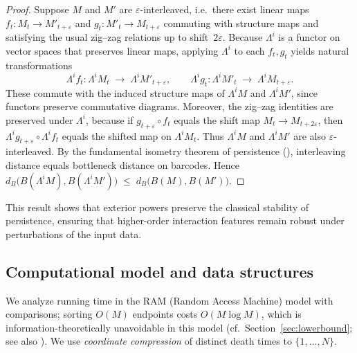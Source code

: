 \documentclass[runningheads]{llncs}
\newcommand{\B}{B}
\newcommand{\Lam}{\Lambda}
\begin{document}
\begin{proof}
Suppose $M$ and $M'$ are $\varepsilon$-interleaved, i.e.\ there exist
linear maps $f_t: M_t \to M'_{t+\varepsilon}$ and
$g_t: M'_t \to M_{t+\varepsilon}$ commuting with structure maps and
satisfying the usual zig–zag relations up to shift~$2\varepsilon$.
Because $\Lam^i$ is a functor on vector spaces that preserves
linear maps, applying $\Lam^i$ to each $f_t,g_t$ yields natural
transformations
\[
   \Lam^i f_t: \Lam^i M_t \;\to\; \Lam^i M'_{t+\varepsilon},
   \qquad
   \Lam^i g_t: \Lam^i M'_t \;\to\; \Lam^i M_{t+\varepsilon}.
\]
These commute with the induced structure maps of $\Lam^i M$ and
$\Lam^i M'$, since functors preserve commutative diagrams.
Moreover, the zig–zag identities are preserved under $\Lam^i$,
because if $g_{t+\varepsilon}\circ f_t$ equals the shift map
$M_t \to M_{t+2\varepsilon}$, then
$\Lam^i g_{t+\varepsilon}\circ \Lam^i f_t$
equals the shifted map on $\Lam^i M_t$.
Thus $\Lam^i M$ and $\Lam^i M'$ are also $\varepsilon$-interleaved.
By the fundamental isometry theorem of persistence
(\cite{ChazalOudot14,ChazalStructure16}), interleaving distance equals
bottleneck distance on barcodes. Hence
$d_B\!\bigl(\B(\Lam^i M),\B(\Lam^i M')\bigr)
   \;\le\; d_B\!\bigl(\B(M),\B(M')\bigr).$
\end{proof}

This result shows that exterior powers preserve the classical stability of persistence, ensuring that higher-order interaction features remain robust under perturbations of the input data.


\subsection{Computational model and data structures}
We analyze running time in the RAM (Random Access Machine) model with comparisons; sorting $O(M)$ endpoints costs $O(M\log M)$, which is information-theoretically unavoidable in this model (cf.\ Section~\ref{sec:lowerbound}; see also \cite{KnuthVol3,CLRS09}). We use \emph{coordinate compression} of distinct death times to $\{1,\dots,N\}$.
\end{document}
